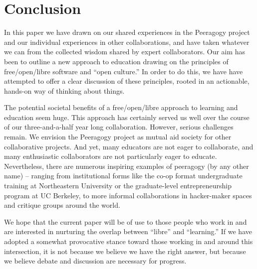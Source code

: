 \section{Conclusion}\label{sec:Conclusion}

In this paper we have drawn on our shared experiences in the Peeragogy
project and our individual experiences in other collaborations, and
have taken whatever we can from the collected wisdom shared by expert
collaborators.  Our aim has been to outline a new approach to
education drawing on the principles of free/open/libre software and
``open culture.''  In order to do this, we have have attempted to
offer a clear discussion of these principles, rooted in an actionable,
hands-on way of thinking about things.

The potential societal benefits of a free/open/libre approach to
learning and education seem huge.  This approach has certainly served
us well over the course of our three-and-a-half year long
collaboration.  However, serious challenges remain.  We envision the
Peeragogy project as mutual aid society for other collaborative
projects.  And yet, many educators are not eager to collaborate, and
many enthusiastic collaborators are not particularly eager to educate.
Nevertheless, there are numerous inspiring examples of peeragogy (by
any other name) -- ranging from institutional forms like the co-op
format undergraduate training at Northeastern University or the
graduate-level entrepreneurship program at UC Berkeley, to more
informal collaborations in hacker-maker spaces and critique groups
around the world.

We hope that the current paper will be of use to those people who work
in and are interested in nurturing the overlap between ``libre'' and
``learning.''  If we have adopted a somewhat provocative stance toward
those working in and around this intersection, it is not because we
believe we have the right answer, but because we believe debate and
discussion are necessary for progress.


